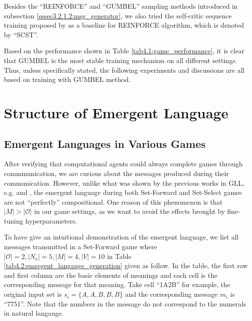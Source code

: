 Besides the ``REINFORCE'' and ``GUMBEL'' sampling methods introduced in subsection \ref{sssec3.2.1.2:msg_generator}, we also tried the self-critic sequence training proposed by \cite{rennie2017self} as a baseline for REINFORCE algorithm, which is denoted by ``SCST''.

Based on the performance shown in Table \ref{tab4.1:game_performance}, it is clear that GUMBEL is the most stable training mechanism on all different settings. Thus, unless specifically stated, the following experiments and discussions are all based on training with GUMBEL method.

\section{Structure of Emergent Language}
\label{sec4.2:structure_emergent_lan}

\subsection{Emergent Languages in Various Games}
\label{ssec4.2.1:emergent_languages}

After verifying that computational agents could always complete games through commmunication, we are curious about the messages produced during their communication. However, unlike what was shown by the previous works in GLL, e.g. \cite{hill2017understanding} and \cite{mordatch2018emergence}, the emergent language during both Set-Forward and Set-Select games are not ``perfectly'' compositional. One reason of this phenomenon is that $|M| > |\mathcal{O}|$ in our game settings, as we want to avoid the effects brought by fine-tuning hyperparameters.

To have give an intuitional demonstration of the emergent language, we list all messages transmitted in a Set-Forward game where $|\mathcal{O}|=2, |N_o|=5, |M|=4, |V|=10$ in Table \ref{tab4.2:emregent_langauge_generation} given as follow. In the table, the first row and first column are the basic elements of meanings and each cell is the corresponding message for that meaning. Take cell ``1A2B'' for example, the original input set is $s_i=\{A,A,B,B,B\}$ and the corresponding message $m_i$ is ``7751''. Note that the numbers in the message do not correspond to the numerals in natural langauge.

